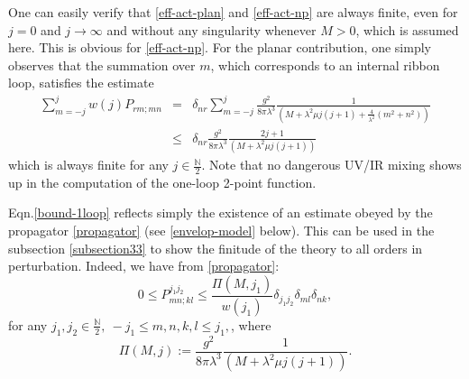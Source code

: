 \documentclass[a4paper,11pt,twoside]{article}
\numberwithin{equation}{section}
\theoremstyle{nonumberplain}
\newcounter{and}
\begin{document}
One can easily verify that \eqref{eff-act-plan} and \eqref{eff-act-np} are always finite, even for $j=0$ and $j\to\infty$ and without any singularity whenever $M>0$, which is assumed here. This is obvious for \eqref{eff-act-np}. For the planar contribution, one simply observes that the summation over $m$, which corresponds to an internal ribbon loop, satisfies the estimate%
%
\begin{eqnarray}
\sum_{m=-j}^jw(j)P_{rm;mn}&=&\delta_{nr}\sum_{m=-j}^j\frac{g^2}{8\pi\lambda^3}\frac{1}{(M+\lambda^2\mu j(j+1)+\frac{4}{\lambda^2}(m^2+n^2))}\nonumber\\
&\le& \delta_{nr}\frac{g^2}{8\pi\lambda^3}\frac{2j+1}{(M+\lambda^2\mu j(j+1))} \label{bound-1loop}
\end{eqnarray}
%
which is always finite for any $j\in\frac{\mathbb{N}}{2}$. Note that no dangerous UV/IR mixing shows up in the computation of the one-loop 2-point function.\par %

Eqn.\eqref{bound-1loop} reflects simply the existence of an estimate obeyed by the propagator \eqref{propagator} (see \eqref{envelop-model} below). This can be used in the subsection \ref{subsection33} to show the finitude of the theory to all orders in perturbation. Indeed, we have from \eqref{propagator}:
\begin{equation}
0\le P^{j_1j_2}_{mn;kl}\le \frac{\Pi(M,j_1)}{w(j_1)}\delta_{j_1j_2}\delta_{ml}\delta_{nk}, \label{envelop-model}
\end{equation}
for any $j_1,j_2\in\frac{\mathbb{N}}{2},\ -j_1\le m,n,k,l\le j_1,$, where
\begin{equation}
\Pi(M,j) := \frac{g^2}{8\pi\lambda^3}\frac{1}{(M+\lambda^2\mu j(j+1))}.\label{Pi}
\end{equation}
\end{document}
